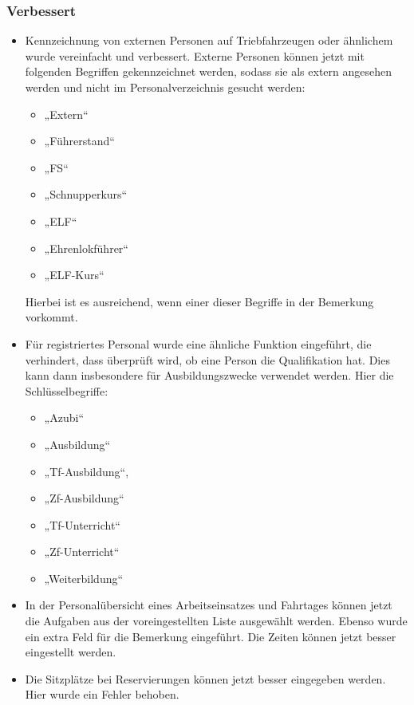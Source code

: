 \subsubsection{Verbessert}
\begin{itemize}
  \item
  Kennzeichnung von externen Personen auf Triebfahrzeugen oder ähnlichem wurde vereinfacht und verbessert. Externe Personen können jetzt mit folgenden Begriffen gekennzeichnet werden, sodass sie als extern angesehen werden und nicht im Personalverzeichnis gesucht werden:
  \begin{itemize}
    \item „Extern“
    \item „Führerstand“
    \item „FS“
    \item „Schnupperkurs“
    \item „ELF“
    \item „Ehrenlokführer“
    \item „ELF-Kurs“
  \end{itemize}
  Hierbei ist es ausreichend, wenn einer dieser Begriffe in der Bemerkung vorkommt.
  \item
  Für registriertes Personal wurde eine ähnliche Funktion eingeführt, die verhindert, dass überprüft wird, ob eine Person die Qualifikation hat. Dies kann dann insbesondere für Ausbildungszwecke verwendet werden. Hier die Schlüsselbegriffe:
  \begin{itemize}
    \item   „Azubi“
    \item  „Ausbildung“
    \item  „Tf-Ausbildung“,
    \item  „Zf-Ausbildung“
    \item  „Tf-Unterricht“
    \item  „Zf-Unterricht“
    \item  „Weiterbildung“
  \end{itemize}
  \item
  In der Personalübersicht eines Arbeitseinsatzes und Fahrtages können jetzt die Aufgaben aus der voreingestellten Liste ausgewählt werden. Ebenso wurde ein extra Feld für die Bemerkung eingeführt. Die Zeiten können jetzt besser eingestellt werden.
  \item
  Die Sitzplätze bei Reservierungen können jetzt besser eingegeben werden. Hier wurde ein Fehler behoben.
\end{itemize}

